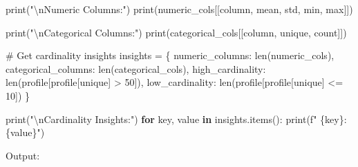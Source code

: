 \documentclass[
  letterpaper,
]{scrbook}
\newenvironment{Shaded}{\begin{snugshade}}{\end{snugshade}}
\newcommand{\BuiltInTok}[1]{\textcolor[rgb]{0.00,0.23,0.31}{#1}}
\newcommand{\CharTok}[1]{\textcolor[rgb]{0.13,0.47,0.30}{#1}}
\newcommand{\CommentTok}[1]{\textcolor[rgb]{0.37,0.37,0.37}{#1}}
\newcommand{\ControlFlowTok}[1]{\textcolor[rgb]{0.00,0.23,0.31}{\textbf{#1}}}
\newcommand{\DecValTok}[1]{\textcolor[rgb]{0.68,0.00,0.00}{#1}}
\newcommand{\KeywordTok}[1]{\textcolor[rgb]{0.00,0.23,0.31}{\textbf{#1}}}
\newcommand{\NormalTok}[1]{\textcolor[rgb]{0.00,0.23,0.31}{#1}}
\newcommand{\OperatorTok}[1]{\textcolor[rgb]{0.37,0.37,0.37}{#1}}
\newcommand{\SpecialCharTok}[1]{\textcolor[rgb]{0.37,0.37,0.37}{#1}}
\newcommand{\SpecialStringTok}[1]{\textcolor[rgb]{0.13,0.47,0.30}{#1}}
\newcommand{\StringTok}[1]{\textcolor[rgb]{0.13,0.47,0.30}{#1}}
\begin{document}
\begin{Shaded}
\begin{Highlighting}[]
\BuiltInTok{print}\NormalTok{(}\StringTok{"}\CharTok{\textbackslash{}n}\StringTok{Numeric Columns:"}\NormalTok{)}
\BuiltInTok{print}\NormalTok{(numeric\_cols[[}\StringTok{\textquotesingle{}column\textquotesingle{}}\NormalTok{, }\StringTok{\textquotesingle{}mean\textquotesingle{}}\NormalTok{, }\StringTok{\textquotesingle{}std\textquotesingle{}}\NormalTok{, }\StringTok{\textquotesingle{}min\textquotesingle{}}\NormalTok{, }\StringTok{\textquotesingle{}max\textquotesingle{}}\NormalTok{]])}

\BuiltInTok{print}\NormalTok{(}\StringTok{"}\CharTok{\textbackslash{}n}\StringTok{Categorical Columns:"}\NormalTok{)}
\BuiltInTok{print}\NormalTok{(categorical\_cols[[}\StringTok{\textquotesingle{}column\textquotesingle{}}\NormalTok{, }\StringTok{\textquotesingle{}unique\textquotesingle{}}\NormalTok{, }\StringTok{\textquotesingle{}count\textquotesingle{}}\NormalTok{]])}

\CommentTok{\# Get cardinality insights}
\NormalTok{insights }\OperatorTok{=}\NormalTok{ \{}
    \StringTok{\textquotesingle{}numeric\_columns\textquotesingle{}}\NormalTok{: }\BuiltInTok{len}\NormalTok{(numeric\_cols),}
    \StringTok{\textquotesingle{}categorical\_columns\textquotesingle{}}\NormalTok{: }\BuiltInTok{len}\NormalTok{(categorical\_cols),}
    \StringTok{\textquotesingle{}high\_cardinality\textquotesingle{}}\NormalTok{: }\BuiltInTok{len}\NormalTok{(profile[profile[}\StringTok{\textquotesingle{}unique\textquotesingle{}}\NormalTok{] }\OperatorTok{\textgreater{}} \DecValTok{50}\NormalTok{]),}
    \StringTok{\textquotesingle{}low\_cardinality\textquotesingle{}}\NormalTok{: }\BuiltInTok{len}\NormalTok{(profile[profile[}\StringTok{\textquotesingle{}unique\textquotesingle{}}\NormalTok{] }\OperatorTok{\textless{}=} \DecValTok{10}\NormalTok{])}
\NormalTok{\}}

\BuiltInTok{print}\NormalTok{(}\StringTok{"}\CharTok{\textbackslash{}n}\StringTok{Cardinality Insights:"}\NormalTok{)}
\ControlFlowTok{for}\NormalTok{ key, value }\KeywordTok{in}\NormalTok{ insights.items():}
    \BuiltInTok{print}\NormalTok{(}\SpecialStringTok{f"  }\SpecialCharTok{\{}\NormalTok{key}\SpecialCharTok{\}}\SpecialStringTok{: }\SpecialCharTok{\{}\NormalTok{value}\SpecialCharTok{\}}\SpecialStringTok{"}\NormalTok{)}
\end{Highlighting}
\end{Shaded}

Output:
\end{document}

